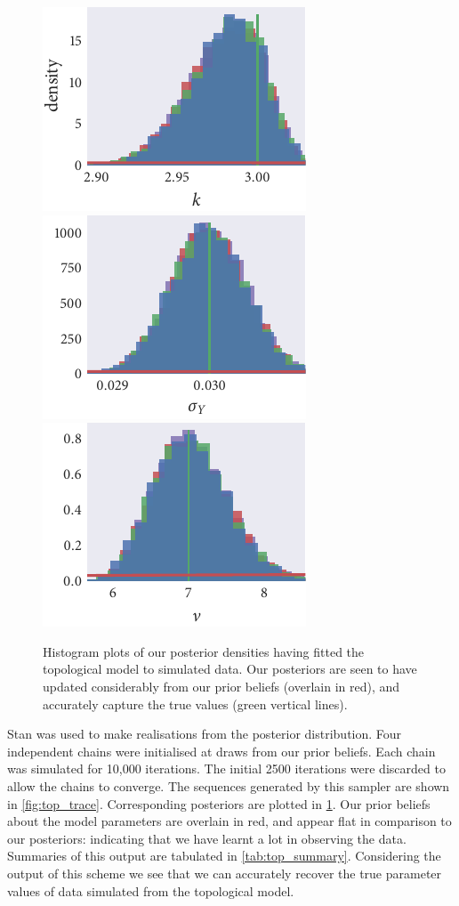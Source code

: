\begin{figure}[tbp]
  \includegraphics{top/top_hist_k.pdf}%
  \includegraphics{top/top_hist_sigma_Y.pdf}%
  \includegraphics{top/top_hist_nu.pdf}
  \caption{Histogram plots of our posterior densities having fitted the
    topological model to simulated data. Our posteriors are seen to have
    updated considerably from our prior beliefs (overlain in red), and accurately
    capture the true values (green vertical lines).}
  \label{fig:top_hist}
\end{figure}

Stan was used to make realisations from the posterior distribution. Four
independent chains were initialised at draws from our prior beliefs. Each chain
was simulated for 10,000 iterations. The initial 2500 iterations were
discarded to allow the chains to converge. The sequences generated by this
sampler are shown in \cref{fig:top_trace}. Corresponding posteriors are
plotted in \cref{fig:top_hist}. Our prior beliefs about the model parameters
are overlain in red, and appear flat in comparison to our posteriors:
indicating that we have learnt a lot in observing the data. Summaries of this
output are tabulated in \cref{tab:top_summary}. Considering the output of this
scheme we see that we can accurately recover the true parameter values of data
simulated from the topological model.


